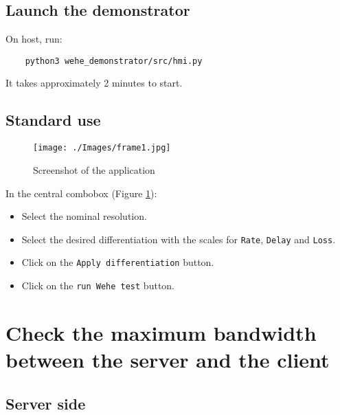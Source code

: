 \documentclass[11pt]{article}
\begin{document}

\subsection{Launch the demonstrator}
\label{sec:orge2c8ddf}

On host, run:
\begin{verbatim}
    python3 wehe_demonstrator/src/hmi.py
\end{verbatim}

It takes approximately 2 minutes to start.


\subsection{Standard use}
\label{sec:org4e04f3b}

\begin{figure}[H]
    \centering
    \texttt{[image: ./Images/frame1.jpg]}
    \caption{Screenshot of the application}
    \label{fig:application}
\end{figure}

In the central combobox (Figure \ref{fig:application}):
\begin{itemize}
    \item Select the nominal resolution.
    \item Select the desired differentiation with the scales for \texttt{Rate}, \texttt{Delay} and \texttt{Loss}.
    \item Click on the \texttt{Apply differentiation} button.
    \item Click on the  \texttt{run Wehe test} button.
\end{itemize}

\clearpage



\section{Check the maximum bandwidth between the server and the client}
\label{sec:org13bbf7b}


\subsection{Server side}
\label{sec:orge4451a3}
\end{document}

